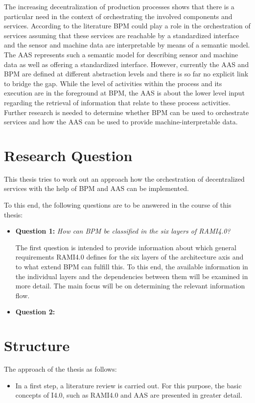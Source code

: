 The increasing decentralization of production processes shows that there is a particular need in the context of orchestrating the involved components and services. According to the literature \ac{BPM} could play a role in the orchestration of services assuming that these services are reachable by a standardized interface and the sensor and machine data are interpretable by means of a semantic model. The \ac{AAS} represents such a semantic model for describing sensor and machine data as well as offering a standardized interface. However, currently the \ac{AAS} and \ac{BPM} are defined at different abstraction levels and there is so far no explicit link to bridge the gap. While the level of activities within the process and its execution are in the foreground at \ac{BPM}, the \ac{AAS} is about the lower level input regarding the retrieval of information that relate to these process activities. Further research is needed to determine whether BPM can be used to orchestrate services and how the \ac{AAS} can be used to provide machine-interpretable data. 

\section{Research Question}
This thesis tries to work out an approach how the orchestration of decentralized services with the help of \ac{BPM} and \ac{AAS} can be implemented.

To this end, the following questions are to be answered in the course of this thesis:

\begin{itemize}
    \item [] \textbf{Question 1:} \textit{How can \ac{BPM} be classified in the six layers of \ac{RAMI4.0}?}
    
    The first question is intended to provide information about which general requirements \ac{RAMI4.0} defines for the six layers of the architecture axis and to what extend \ac{BPM} can fulfill this. To this end, the available information in the individual layers and the dependencies between them will be examined in more detail. The main focus will be on determining the relevant information flow. 
    
    \item [] \textbf{Question 2:} \textit{}

\end{itemize}

\section{Structure}
The approach of the thesis as follows:
\begin{itemize}
    \item In a first step, a literature review is carried out. For this purpose, the basic concepts of \ac{I4.0}, such as \ac{RAMI4.0} and \ac{AAS} are presented in greater detail. 
\end{itemize}






